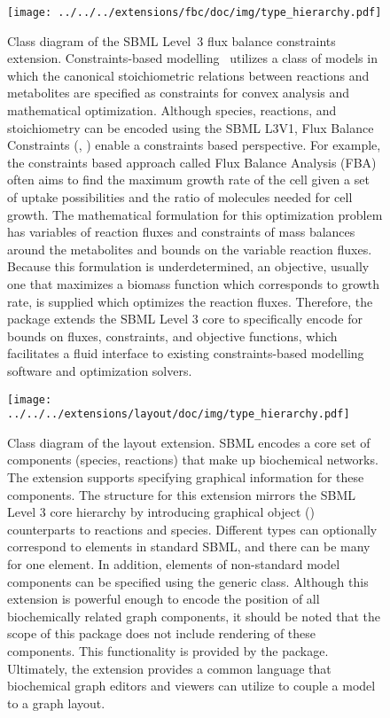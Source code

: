 \begin{figure}[H]
 \vspace*{-3em}
 \centering
\texttt{[image: ../../../extensions/fbc/doc/img/type\_hierarchy.pdf]}
 \vspace*{-5.5em}
 \caption[Class diagram of the flux balance constraints extension.]{Class
   diagram of the SBML Level~3 flux balance constraints
   extension. Constraints-based modelling~\cite{lewis2012} utilizes a class
   of models in which the canonical stoichiometric relations between
   reactions and metabolites are specified as constraints for convex analysis
   and mathematical optimization. Although species, reactions, and
   stoichiometry can be encoded using the SBML L3V1, Flux Balance Constraints
   (, \cite{olivier2013}) enable a constraints based
   perspective. For example, the constraints based approach called Flux
   Balance Analysis (FBA) often aims to find the maximum growth rate of the
   cell given a set of uptake possibilities and the ratio of molecules needed
   for cell growth. The mathematical formulation for this optimization
   problem has variables of reaction fluxes and constraints of mass balances
   around the metabolites and bounds on the variable reaction fluxes. Because
   this formulation is underdetermined, an objective, usually one that
   maximizes a biomass function which corresponds to growth rate, is supplied
   which optimizes the reaction fluxes. Therefore, the  package
   extends the SBML Level 3 core to specifically encode for bounds on fluxes,
   constraints, and objective functions, which facilitates a fluid interface
   to existing constraints-based modelling software and optimization
   solvers.}
 \label{fig:fbc}
\end{figure}


\begin{figure}[H]
 \centering
\texttt{[image: ../../../extensions/layout/doc/img/type\_hierarchy.pdf]}
 \vspace*{-5em}
 \caption[Class diagram of the layout extension]{Class diagram of the layout extension. SBML encodes a core set of components (species, reactions) that make up
biochemical networks. The  extension supports specifying graphical
information for these components. The structure for this extension mirrors 
the SBML Level 3 core hierarchy by introducing graphical object ()
counterparts to reactions and species. Different  types can optionally correspond
to elements in standard SBML, and there can be many  for one element.
In addition,  elements of non-standard model components can be specified
using the generic  class. Although this extension is powerful
enough to encode the position of all biochemically related graph components,
it should be noted that the scope of this package does not include rendering
of these components. This functionality is provided by the  package.
Ultimately, the  extension provides a common language that biochemical
graph editors and viewers can utilize to couple a model to a graph layout.}
 \label{fig:layout}
\end{figure}


